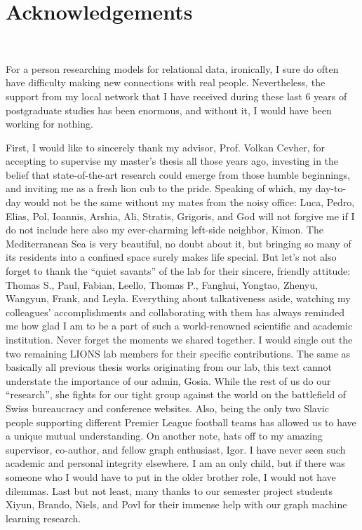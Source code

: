 \chapter*{Acknowledgements}
~\newline~\newline~

For a person researching models for relational data, ironically, I sure do often have difficulty making new connections with real people. Nevertheless, the support from my local network that I have received during these last 6 years of postgraduate studies has been enormous, and without it, I would have been working for nothing.

First, I would like to sincerely thank my advisor, Prof. Volkan Cevher, for accepting to supervise my master's thesis all those years ago, investing in the belief that state-of-the-art research could emerge from those humble beginnings, and inviting me as a fresh lion cub to the pride. Speaking of which, my day-to-day would not be the same without my mates from the noisy office: Luca, Pedro, Elias, Pol, Ioannis, Arshia, Ali, Stratis, Grigoris, and God will not forgive me if I do not include here also my ever-charming left-side neighbor, Kimon. The Mediterranean Sea is very beautiful, no doubt about it, but bringing so many of its residents into a confined space surely makes life special. But let's not also forget to thank the \enquote{quiet savants} of the lab for their sincere, friendly attitude: Thomas S., Paul, Fabian, Leello, Thomas P., Fanghui, Yongtao, Zhenyu, Wangyun, Frank, and Leyla. Everything about talkativeness aside, watching my colleagues' accomplishments and collaborating with them has always reminded me how glad I am to be a part of such a world-renowned scientific and academic institution. Never forget the moments we shared together. I would single out the two remaining LIONS lab members for their specific contributions. The same as basically all previous thesis works originating from our lab, this text cannot understate the importance of our admin, Gosia. While the rest of us do our \enquote{research}, she fights for our tight group against the world on the battlefield of Swiss bureaucracy and conference websites. Also, being the only two Slavic people supporting different Premier League football teams has allowed us to have a unique mutual understanding. On another note, hats off to my amazing supervisor, co-author, and fellow graph enthusiast, Igor. I have never seen such academic and personal integrity elsewhere. I am an only child, but if there was someone who I would have to put in the older brother role, I would not have dilemmas. Last but not least, many thanks to our semester project students Xiyun, Brando, Niels, and Povl for their immense help with our graph machine learning research.


